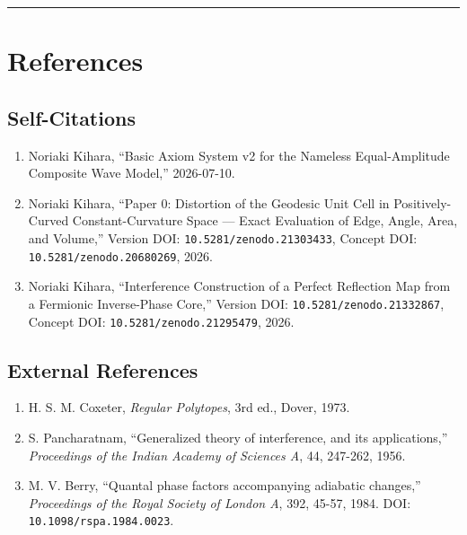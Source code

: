 \documentclass[
  a4paper,
]{article}
\providecommand{\tightlist}{%
  \setlength{\itemsep}{0pt}\setlength{\parskip}{0pt}}
\begin{document}
\begin{center}\rule{0.5\linewidth}{0.5pt}\end{center}

\section{References}\label{references}

\subsection{Self-Citations}\label{self-citations}

\begin{enumerate}
\def\labelenumi{\arabic{enumi}.}
\tightlist
\item
  Noriaki Kihara, ``Basic Axiom System v2 for the Nameless
  Equal-Amplitude Composite Wave Model,'' 2026-07-10.
\item
  Noriaki Kihara, ``Paper 0: Distortion of the Geodesic Unit Cell in
  Positively-Curved Constant-Curvature Space --- Exact Evaluation of
  Edge, Angle, Area, and Volume,'' Version DOI:
  \texttt{10.5281/zenodo.21303433}, Concept DOI:
  \texttt{10.5281/zenodo.20680269}, 2026.
\item
  Noriaki Kihara, ``Interference Construction of a Perfect Reflection
  Map from a Fermionic Inverse-Phase Core,'' Version DOI:
  \texttt{10.5281/zenodo.21332867}, Concept DOI:
  \texttt{10.5281/zenodo.21295479}, 2026.
\end{enumerate}

\subsection{External References}\label{external-references}

\begin{enumerate}
\def\labelenumi{\arabic{enumi}.}
\setcounter{enumi}{3}
\tightlist
\item
  H. S. M. Coxeter, \emph{Regular Polytopes}, 3rd ed., Dover, 1973.
\item
  S. Pancharatnam, ``Generalized theory of interference, and its
  applications,'' \emph{Proceedings of the Indian Academy of Sciences
  A}, 44, 247-262, 1956.
\item
  M. V. Berry, ``Quantal phase factors accompanying adiabatic changes,''
  \emph{Proceedings of the Royal Society of London A}, 392, 45-57, 1984.
  DOI: \texttt{10.1098/rspa.1984.0023}.
\end{enumerate}
\end{document}

